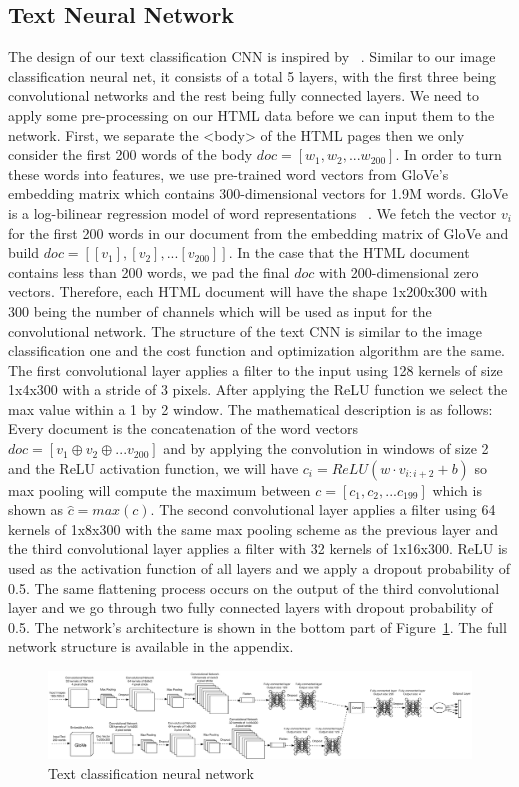 \documentclass{article} %
\begin{document}
\subsection{Text Neural Network}
The design of our text classification CNN is inspired by ~\cite{convtext}. Similar to our image classification neural net, it consists of a total 5 layers, with the first three being convolutional networks and the rest being fully connected layers. We need to apply some pre-processing on our HTML data before we can input them to the network. First, we separate the <body> of the HTML pages then we only consider the first 200 words of the body $doc=[w_1,w_2,...w_{200}]$. In order to turn these words into features, we use pre-trained word vectors from GloVe's embedding matrix which contains 300-dimensional vectors for 1.9M words. GloVe is a log-bilinear regression model of word representations ~\cite{glove}. We fetch the vector $v_i$ for the first 200 words in our document from the embedding matrix of GloVe and build $doc = [[v_1],[v_2],...[v_{200}]]$. In the case that the HTML document contains less than 200 words, we pad the final $doc$ with 200-dimensional zero vectors. Therefore, each HTML document will have the shape 1x200x300 with 300 being the number of channels which will be used as input for the convolutional network. The structure of the text CNN is similar to the image classification one and the cost function and optimization algorithm are the same. The first convolutional layer applies a filter to the input using 128 kernels of size 1x4x300 with a stride of 3 pixels. After applying the ReLU function we select the max value within a 1 by 2 window. The mathematical description is as follows:
Every document is the concatenation of the word vectors $doc = [v_1 \oplus v_2 \oplus ... v_{200}]$ and by applying the convolution in windows of size 2 and the ReLU activation function, we will have $c_i = ReLU(w\cdot v_{i:i+2} +b)$ so max pooling will compute the maximum between $c = [c_1, c_2, ... c_{199}]$ which is shown as $\hat{c} = max(c)$.
The second convolutional layer applies a filter using 64 kernels of 1x8x300 with the same max pooling scheme as the previous layer and the third convolutional layer applies a filter with 32 kernels of 1x16x300. ReLU is used as the activation function of all layers and we apply a dropout probability of 0.5. The same flattening process occurs on the output of the third convolutional layer and we go through two fully connected layers with dropout probability of 0.5. The network's architecture is shown in the bottom part of Figure~\ref{fig:cnn}. The full network structure is available in the appendix.
\begin{figure}
\centering
        \includegraphics[totalheight=3cm]{Combined}
    \caption{Text classification neural network}
    \label{fig:cnn}
\end{figure}
\end{document}
